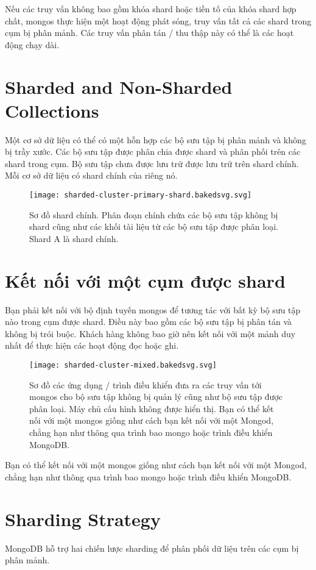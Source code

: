 Nếu các truy vấn không bao gồm khóa shard hoặc tiền tố của khóa shard hợp chất, mongos thực hiện một hoạt động phát sóng, truy vấn tất cả các shard trong cụm bị phân mảnh. Các truy vấn phân tán / thu thập này có thể là các hoạt động chạy dài.

\section{Sharded and Non-Sharded Collections}
Một cơ sở dữ liệu có thể có một hỗn hợp các bộ sưu tập bị phân mảnh và không bị trầy xước. Các bộ sưu tập được phân chia được shard và phân phối trên các shard trong cụm. Bộ sưu tập chưa được lưu trữ được lưu trữ trên shard chính. Mỗi cơ sở dữ liệu có shard chính của riêng nó.

\begin{figure}[h!]
\centering
\captionsetup{justification=centering,margin=1cm}
  	\texttt{[image: sharded-cluster-primary-shard.bakedsvg.svg]}
  \caption{Sơ đồ shard chính. Phân đoạn chính chứa các bộ sưu tập không bị shard cũng như các khối tài liệu từ các bộ sưu tập được phân loại. Shard A là shard chính.}
  \end{figure}

\section{Kết nối với một cụm được shard}
Bạn phải kết nối với bộ định tuyến mongos để tương tác với bất kỳ bộ sưu tập nào trong cụm được shard. Điều này bao gồm các bộ sưu tập bị phân tán và không bị trói buộc. Khách hàng không bao giờ nên kết nối với một mảnh duy nhất để thực hiện các hoạt động đọc hoặc ghi.

\begin{figure}[h!]
\centering
\captionsetup{justification=centering,margin=1cm}
  	\texttt{[image: sharded-cluster-mixed.bakedsvg.svg]}
  \caption{Sơ đồ các ứng dụng / trình điều khiển đưa ra các truy vấn tới mongos cho bộ sưu tập không bị quản lý cũng như bộ sưu tập được phân loại. Máy chủ cấu hình không được hiển thị. Bạn có thể kết nối với một mongos giống như cách bạn kết nối với một Mongod, chẳng hạn như thông qua trình bao mongo hoặc trình điều khiển MongoDB.}
  \end{figure}

Bạn có thể kết nối với một mongos giống như cách bạn kết nối với một Mongod, chẳng hạn như thông qua trình bao mongo hoặc trình điều khiển MongoDB.

\section{Sharding Strategy}
MongoDB hỗ trợ hai chiến lược sharding để phân phối dữ liệu trên các cụm bị phân mảnh.

